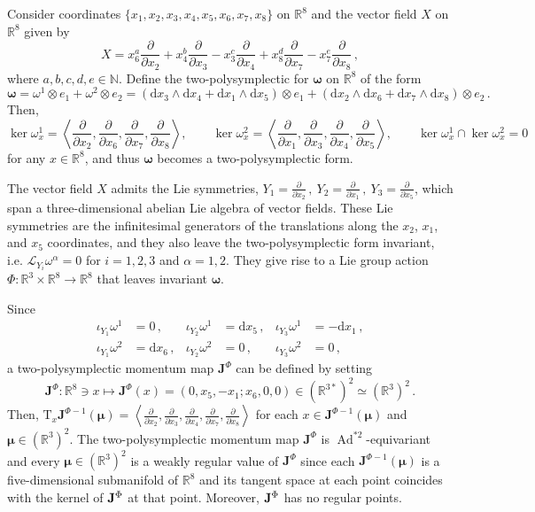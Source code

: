 \documentclass[11pt]{article}
\theoremstyle{plain}
\theoremstyle{definition}
\newcommand{\T}{\mathrm{T}}
\newcommand{\bomega}{{\boldsymbol{\omega}}}
\renewcommand{\d}{\mathrm{d}}
\newcommand{\bfJ}{\mathbf{J}}
\newcommand{\Lie}{\mathscr{L}}
\newcommand{\parder}[2]{\frac{\partial #1}{\partial #2}}
\DeclareMathOperator{\Ad}{Ad}
\def\d{\mathrm{d}}
\numberwithin{equation}{section}
\begin{document}
Consider coordinates $\{x_1,x_2,x_3,x_4,x_5,x_6,x_7,x_8\}$ on $\mathbb{R}^8$ and  the vector field $X$ on $\mathbb{R}^8$ given by
$$
    X = x_6^a\parder{}{x_2}+x_4^b\parder{}{x_3}-x_3^c\parder{}{x_4}+x_8^d\parder{}{x_7}-x_7^e\parder{}{x_8}\,,
$$
where $a,b,c,d,e\in \mathbb{N}$. Define  the two-polysymplectic for $\bomega$ 
 on $\mathbb{R}^8$ of the form
 $$
    \bm\omega = \omega^1\otimes e_1 + \omega^2\otimes e_2 = (\d x_3\wedge \d x_4 + \d x_1\wedge \d x_5)\otimes e_1 + (\d x_2\wedge \d x_6 + \d x_7\wedge \d x_8)\otimes e_2\,.
$$
Then, 
$$
\ker\omega_x^1 = \left\langle \parder{}{x_2},\parder{}{x_6},\parder{}{x_7},\parder{}{x_8}\right\rangle,\qquad  \ker\omega^2_x = \left\langle \parder{}{x_1},\parder{}{x_3},\parder{}{x_4},\parder{}{x_5}\right\rangle,\qquad \ker\omega^1_x\cap\ker\omega^2_x=0
$$ for any $x\in \mathbb{R}^8$, and thus $\bm\omega$ becomes a two-polysymplectic form. 

The vector field $X$ admits the Lie symmetries,
$Y_1 = \parder{}{x_2}\,,\  Y_2=\parder{}{x_1}\,,\  Y_3=\parder{}{x_5}$, which span a three-dimensional abelian Lie algebra of vector fields. These Lie symmetries are the infinitesimal generators of the translations along the $x_2$, $x_1$, and $x_5$ coordinates, and they also leave the two-polysymplectic form invariant, i.e. $\Lie_{Y_i}\omega^\alpha=0$ for $i=1,2,3$ and $\alpha=1,2$. They give rise to a Lie group action $\Phi:\mathbb{R}^3\times \mathbb{R}^8\rightarrow \mathbb{R}^8$ that leaves invariant $\bm{\omega}$. 

Since
\begin{align}
    \iota_{Y_1}\omega^1 &= 0\,, &\iota_{Y_2}\omega^1 &= \d x_5\,, &\iota_{Y_3}\omega^1 &= -\d x_1\,,\\
    \iota_{Y_1}\omega^2 &= \d x_6\,, &\iota_{Y_2}\omega^2 &= 0\,,  &\iota_{Y_3}\omega^2 &= 0\,,
\end{align}
a two-polysymplectic momentum map $\mathbf{J}^\Phi$ can be defined by setting
$$
    \bfJ^\Phi:\mathbb{R}^8\ni x\longmapsto \mathbf{J}^\Phi(x)=(0, x_5,-x_1;x_6,0,0)\in (\mathbb{R}^{3*})^2\simeq (\mathbb{R}^3)^2\,.
$$
Then, $\T_x\mathbf{J}^{\Phi-1}(\bm\mu) = \left\langle \parder{}{x_2},\parder{}{x_3},\parder{}{x_4},\parder{}{x_7},\parder{}{x_8}\right\rangle$ for each $x\in\mathbf{J}^{\Phi-1}(\bm\mu)$ and $\bm\mu\in (\mathbb{R}^3)^2$. The two-polysymplectic momentum map $\mathbf{J}^\Phi$ is $\Ad^{*2}$-equivariant and every $\bm\mu\in (\mathbb{R}^3)^2$ is a weakly regular value of $\mathbf{J}^\Phi$ since each $\mathbf{J}^{\Phi-1}(\bm\mu)$ is a five-dimensional submanifold of $\mathbb{R}^8$ and its tangent space at each point coincides with the kernel of ${\bf J}^\Phi$ at that point. Moreover, ${\bf J}^\Phi$ has no regular points.
\end{document}

